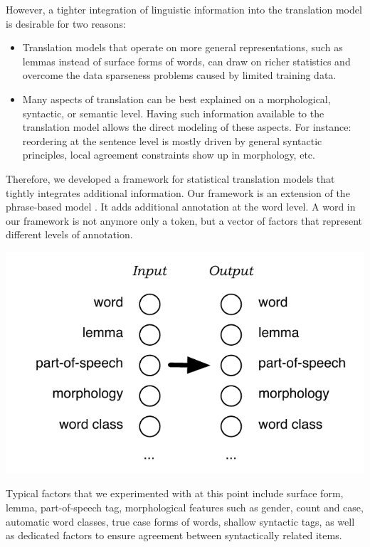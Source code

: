 \documentclass[11pt]{report}
\theoremstyle{plain}
\begin{document}
However, a tighter integration of linguistic information into the translation model is desirable for two reasons:
\begin{itemize}
\item Translation models that operate on more general representations, such as lemmas instead of surface forms of words, can draw on richer statistics and overcome the data sparseness problems caused by limited training data.
\item Many aspects of translation can be best explained on a morphological, syntactic, or semantic level. Having such information available to the translation model allows the direct modeling of these aspects. For instance: reordering at the sentence level is mostly driven by general syntactic principles, local agreement constraints show up in morphology, etc.
\end{itemize}

Therefore, we developed a framework for statistical translation models that tightly integrates additional information. Our framework is an extension of the phrase-based model \cite{OchThesis}. It adds additional annotation at the word level. A word in our framework is not anymore only a token, but a vector of factors that represent different levels of annotation.

\begin{center}
\includegraphics[scale=0.75]{factors.pdf}
\end{center}

Typical factors that we experimented with at this point include surface form, lemma, part-of-speech tag, morphological features such as gender, count and case, automatic word classes, true case forms of words, shallow syntactic tags, as well as dedicated factors to ensure agreement between syntactically related items. 
\end{document}
